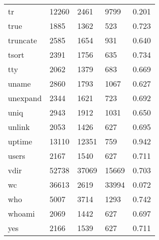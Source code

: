 \begin{longtable}{lp{3.0cm}p{3.0cm}p{3.0cm}p{3.0cm}}
tr        &                    12260 &         2461 &          9799 &                    0.201 \\
true      &                     1885 &         1362 &           523 &                    0.723 \\
truncate  &                     2585 &         1654 &           931 &                    0.640 \\
tsort     &                     2391 &         1756 &           635 &                    0.734 \\
tty       &                     2062 &         1379 &           683 &                    0.669 \\
uname     &                     2860 &         1793 &          1067 &                    0.627 \\
unexpand  &                     2344 &         1621 &           723 &                    0.692 \\
uniq      &                     2943 &         1912 &          1031 &                    0.650 \\
unlink    &                     2053 &         1426 &           627 &                    0.695 \\
uptime    &                    13110 &        12351 &           759 &                    0.942 \\
users     &                     2167 &         1540 &           627 &                    0.711 \\
vdir      &                    52738 &        37069 &         15669 &                    0.703 \\
wc        &                    36613 &         2619 &         33994 &                    0.072 \\
who       &                     5007 &         3714 &          1293 &                    0.742 \\
whoami    &                     2069 &         1442 &           627 &                    0.697 \\
yes       &                     2166 &         1539 &           627 &                    0.711 \\
\end{longtable}
